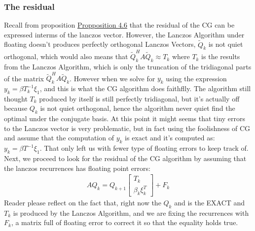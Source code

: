 \documentclass[]{article}
\theoremstyle{definition}
\begin{document}
        \subsubsection*{The residual}
            Recall from proposition \hyperref[prop:Lanczos_Vectors_and_Residuals]{Propposition 4.6} that the residual of the CG can be expressed interms of the lanczos vector. However, the Lanczos Algorithm under floating doesn't produces perfectly orthogonal Lanczos Vectors, $\tilde{Q}_k$ is not quiet orthogonal, which would also means that $\tilde{Q}_k^HA\tilde{Q}_k\approx T_k$ where $T_k$ is the results from the Lanczos Algorithm, which is only the truncation of the tridiagonal parts of the matrix $\tilde{Q}_k^HA\tilde{Q}_k$. However when we solve for $y_k$ using the expression $y_k = \beta T^{-1}_k\xi_1$, and this is what the CG algorithm does faithflly. The algorithm still thought $T_k$ produced by itself is still perfectly tridiagonal, but it's actually off because $Q_k$ is not quiet orthogonal, hence the algorithm never quiet find the optimal under the conjugate basis. At this point it might seems that tiny errors to the Lanczos vector is very problematic, but in fact
            using the foolishness of CG and assume that the computation of $y_k$ is exact and it's computed as: $y_k = \beta T^{-1}\xi_1$. That only left us with fewer type of floating errors to keep track of. Next, we proceed to look for the residual of the CG algorithm by assuming that the lanczos recurrences has floating point errors: 
            \begin{align}
                AQ_k = Q_{k + 1} \begin{bmatrix}
                    T_k
                    \\
                    \beta_k \xi_k^T
                \end{bmatrix} + F_k
            \end{align}
            Reader please reflect on the fact that, right now the $Q_k$ and is the EXACT and $T_k$ is produced by the Lanczos Algorithm, and we are fixing the recurrences with $F_k$, a matrix full of floating error to correct it so that the equality holds true. 
\end{document}
